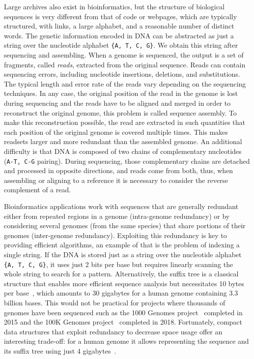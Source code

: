 Large archives also exist in bioinformatics, but the structure of biological sequences is very different from that of code or webpages, which are typically structured, with links, a large alphabet, and a reasonable number of distinct words.
The genetic information encoded in DNA can be abstracted as just a string over the nucleotide alphabet \texttt{\{A, T, C, G\}}.
We obtain this string after sequencing and assembling. When a genome is sequenced, the output is a set of fragments, called \emph{reads}, extracted from the original sequence. Reads can contain sequencing errors, including nucleotide insertions, deletions, and substitutions. The typical length and error rate of the reads vary depending on the sequencing techniques.
%
In any case, the original position of the read in the genome is lost during sequencing and the reads have to be aligned and merged in order to reconstruct the original genome, this problem is called sequence assembly. To make this reconstruction possible, the read are extracted in such quantities that each position of the original genome is covered multiple times. This makes readsets larger and more redundant than the assembled genome. 
An additional difficulty is that DNA is composed of two chains of complementary nucleotides (\texttt{A-T, C-G} pairing). During sequencing, those complementary chains are detached and processed in opposite directions, and reads come from both, thus, when assembling or aligning to a reference it is necessary to consider the reverse complement of a read.


Bioinformatics applications work with sequences that are generally redundant either from repeated regions in a genome (intra-genome redundancy) or by considering several genomes (from the same species) that share portions of their genomes (inter-genome redundancy).
Exploiting this redundancy is key to providing efficient algorithms, an example of that is the problem of indexing a single string.
If the DNA is stored just as a string over the nucleotide alphabet \texttt{\{A, T, C, G\}}, it uses just 2 bits per base but requires linearly scanning the whole string to search for a pattern. 
Alternatively, the suffix tree is a classical structure that enables more efficient sequence analysis but necessitates 10 bytes per base~\cite{navarro2016compact}, which amounts to 30 gigabytes for a human genome containing 3.3 billion bases. 
This would not be practical for projects where thousands of genomes have been sequenced such as the 1000 Genomes project~\cite{10002015global} completed in 2015 and the 100K Genomes project~\cite{100Kgenomes} completed in 2018. 
Fortunately, compact data structures that exploit redundancy to decrease space usage offer an interesting trade-off: for a human genome it allows representing the sequence and its suffix tree using just 4 gigabytes~\cite{navarro2016compact}.

